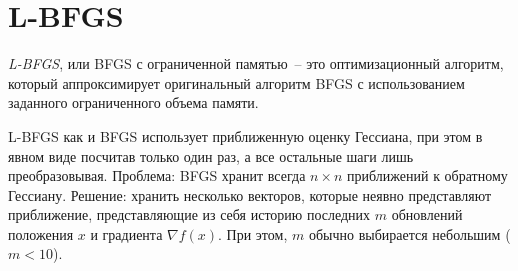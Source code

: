 \documentclass[12pt, a4paper, oneside, final]{article}
\begin{document}
	\section*{L-BFGS}
	\textit{L-BFGS}, или BFGS с ограниченной памятью~-- это оптимизационный алгоритм, который аппроксимирует оригинальный алгоритм BFGS с использованием заданного ограниченного объема памяти.

	L-BFGS как и BFGS использует приближенную оценку Гессиана, при этом в явном виде посчитав только один раз, а все остальные шаги лишь преобразовывая.
	Проблема: BFGS хранит всегда $n \times n$ приближений к обратному Гессиану.
	Решение: хранить несколько векторов, которые неявно представляют приближение, представляющие из себя историю последних $m$ обновлений положения $x$ и градиента $\nabla{f(x)}$.
	При этом, $m$ обычно выбирается небольшим ($m < 10$).
\end{document}
